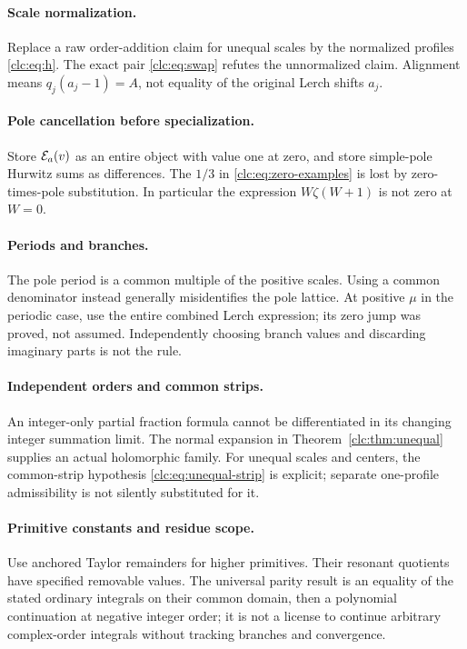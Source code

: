 \documentclass[11pt,a4paper]{article}
\numberwithin{equation}{section}
\theoremstyle{definition}\newtheorem{definition}[theorem]{Definition}
\theoremstyle{remark}\newtheorem{remark}[theorem]{Remark}
\begin{document}
\paragraph{Scale normalization.}
Replace a raw order-addition claim for unequal scales by the normalized
profiles \eqref{clc:eq:h}. The exact pair \eqref{clc:eq:swap} refutes the
unnormalized claim. Alignment means $q_j(a_j-1)=A$, not equality of the
original Lerch shifts $a_j$.

\paragraph{Pole cancellation before specialization.}
Store $\mathcal E_a(v)$ as an entire object with value one at zero, and store
simple-pole Hurwitz sums as differences. The $1/3$ in
\eqref{clc:eq:zero-examples} is lost by zero-times-pole substitution.
In particular the expression $W\zeta(W+1)$ is not zero at $W=0$.

\paragraph{Periods and branches.}
The pole period is a common multiple of the positive scales.
Using a common denominator instead generally misidentifies the pole
lattice. At positive $\mu$ in the periodic case, use the entire combined
Lerch expression; its zero jump was proved, not assumed. Independently
choosing branch values and discarding imaginary parts is not the rule.

\paragraph{Independent orders and common strips.}
An integer-only partial fraction formula cannot be differentiated in
its changing integer summation limit. The normal expansion in
Theorem~\ref{clc:thm:unequal} supplies an actual holomorphic family.
For unequal scales and centers, the common-strip hypothesis
\eqref{clc:eq:unequal-strip} is explicit; separate one-profile
admissibility is not silently substituted for it.

\paragraph{Primitive constants and residue scope.}
Use anchored Taylor remainders for higher primitives. Their resonant
quotients have specified removable values. The universal parity result
is an equality of the stated ordinary integrals on their common domain,
then a polynomial continuation at negative integer order; it is not a
license to continue arbitrary complex-order integrals without tracking
branches and convergence.
\end{document}
